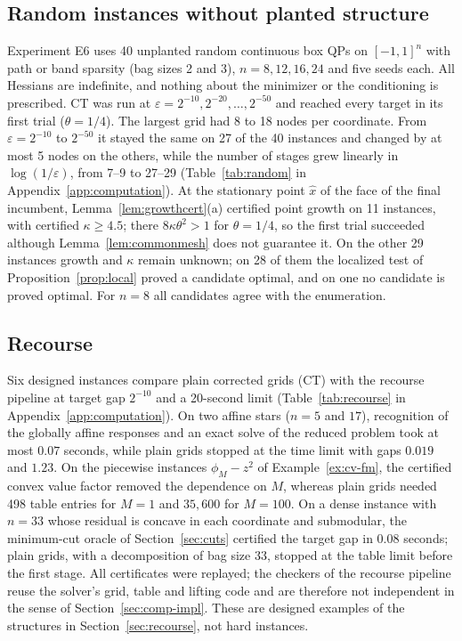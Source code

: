 \subsection{Random instances without planted structure}\label{sec:comp-random}
Experiment E6 uses 40 unplanted random continuous box QPs on $[-1,1]^n$ with
path or band sparsity (bag sizes 2 and 3), $n=8,12,16,24$ and five seeds
each. All Hessians are indefinite, and nothing about the minimizer or the
conditioning is prescribed. CT was run at
$\varepsilon=2^{-10},2^{-20},\dots,2^{-50}$ and reached every target in its
first trial ($\theta=1/4$). The largest grid had 8 to 18 nodes per coordinate.
From $\varepsilon=2^{-10}$ to $2^{-50}$ it stayed the same on 27 of the 40
instances and changed by at most 5 nodes on the others, while the number of
stages grew linearly in $\log(1/\varepsilon)$, from 7--9 to 27--29
(Table~\ref{tab:random} in Appendix~\ref{app:computation}). At the
stationary point $\hat x$ of the face of the final incumbent,
Lemma~\ref{lem:growthcert}(a) certified point growth on 11 instances, with
certified $\kappa\ge4.5$; there $8\kappa\theta^2>1$ for $\theta=1/4$, so the
first trial succeeded although Lemma~\ref{lem:commonmesh} does not guarantee
it. On the other 29 instances growth and $\kappa$ remain unknown; on 28 of
them the localized test of Proposition~\ref{prop:local} proved a candidate
optimal, and on one no candidate is proved optimal. For $n=8$ all candidates
agree with the enumeration.

\subsection{Recourse}\label{sec:comp-recourse}
Six designed instances compare plain corrected grids (CT) with the recourse
pipeline at target gap $2^{-10}$ and a 20-second limit
(Table~\ref{tab:recourse} in Appendix~\ref{app:computation}). On two affine
stars ($n=5$ and $17$), recognition of the globally affine responses and an
exact solve of the reduced problem took at most $0.07$ seconds, while plain
grids stopped at the time limit with gaps $0.019$ and $1.23$. On the
piecewise instances $\phi_M-z^2$ of Example~\ref{ex:cv-fm}, the certified
convex value factor removed the dependence on $M$, whereas plain grids needed
498 table entries for $M=1$ and $35{,}600$ for $M=100$. On a dense instance
with $n=33$ whose residual is concave in each coordinate and submodular, the
minimum-cut oracle of Section~\ref{sec:cuts} certified the target gap in
$0.08$ seconds; plain grids, with a decomposition of bag size 33, stopped at
the table limit before the first stage. All certificates were replayed; the
checkers of the recourse pipeline reuse the solver's grid, table and lifting
code and are therefore not independent in the sense of
Section~\ref{sec:comp-impl}. These are designed examples of the structures in
Section~\ref{sec:recourse}, not hard instances.

